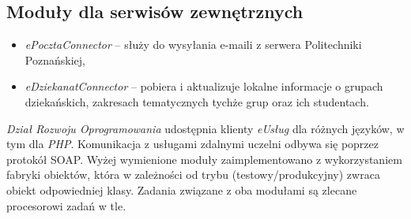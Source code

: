 \subsection{Moduły dla serwisów zewnętrznych}
\begin{itemize}
\item \emph{ePocztaConnector} -- służy do wysyłania e-maili z serwera Politechniki Poznańskiej,
\item \emph{eDziekanatConnector} -- pobiera i aktualizuje lokalne informacje o grupach dziekańskich, zakresach tematycznych tychże grup oraz ich studentach.
\end{itemize}

\emph{Dział Rozwoju Oprogramowania} udostępnia klienty \emph{eUsług} dla różnych języków, w tym dla \emph{PHP}. Komunikacja z usługami zdalnymi uczelni odbywa się poprzez protokół SOAP. Wyżej wymienione moduły zaimplementowano z wykorzystaniem fabryki obiektów, która w zależności od trybu (testowy/produkcyjny) zwraca obiekt odpowiedniej klasy. Zadania związane z oba modułami są zlecane procesorowi zadań w tle.